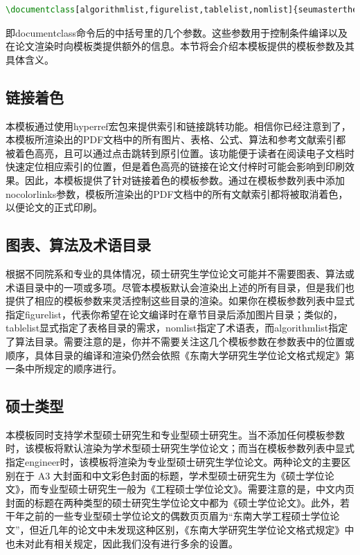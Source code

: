 \begin{tcolorbox}
\begin{lstlisting}[language=TeX]
\documentclass[algorithmlist,figurelist,tablelist,nomlist]{seumasterthesis}
\end{lstlisting}
\end{tcolorbox}

\noindent 即{\codefont documentclass}命令后的中括号里的几个参数。这些参数用于控制条件编译以及在论文渲染时向模板类提供额外的信息。本节将会介绍本模板提供的模板参数及其具体含义。

\subsection{链接着色}

本模板通过使用hyperref宏包来提供索引和链接跳转功能。相信你已经注意到了，本模板所渲染出的PDF文档中的所有图片、表格、公式、算法和参考文献索引都被着色高亮，且可以通过点击跳转到原引位置。该功能便于读者在阅读电子文档时快速定位相应索引的位置，但是着色高亮的链接在论文付梓时可能会影响到印刷效果。因此，本模板提供了针对链接着色的模板参数。通过在模板参数列表中添加{\codefont nocolorlinks}参数，模板所渲染出的PDF文档中的所有文献索引都将被取消着色，以便论文的正式印刷。

\subsection{图表、算法及术语目录}

根据不同院系和专业的具体情况，硕士研究生学位论文可能并不需要图表、算法或术语目录中的一项或多项。尽管本模板默认会渲染出上述的所有目录，但是我们也提供了相应的模板参数来灵活控制这些目录的渲染。如果你在模板参数列表中显式指定{\codefont figurelist}，代表你希望在论文编译时在章节目录后添加图片目录；类似的，{\codefont tablelist}显式指定了表格目录的需求，{\codefont nomlist}指定了术语表，而{\codefont algorithmlist}指定了算法目录。需要注意的是，你并不需要关注这几个模板参数在参数表中的位置或顺序，具体目录的编译和渲染仍然会依照《东南大学研究生学位论文格式规定》\cite{seugs2015rule}第一条中所规定的顺序进行。

\subsection{硕士类型}

本模板同时支持学术型硕士研究生和专业型硕士研究生。当不添加任何模板参数时，该模板将默认渲染为学术型硕士研究生学位论文；而当在模板参数列表中显式指定{\codefont engineer}时，该模板将渲染为专业型硕士研究生学位论文。两种论文的主要区别在于 A3 大封面和中文彩色封面的标题，学术型硕士研究生为《硕士学位论文》，而专业型硕士研究生一般为《工程硕士学位论文》。需要注意的是，中文内页封面的标题在两种类型的硕士研究生学位论文中都为《硕士学位论文》。此外，若干年之前的一些专业型硕士学位论文的偶数页页眉为“东南大学工程硕士学位论文”，但近几年的论文中未发现这种区别，《东南大学研究生学位论文格式规定》中也未对此有相关规定，因此我们没有进行多余的设置。